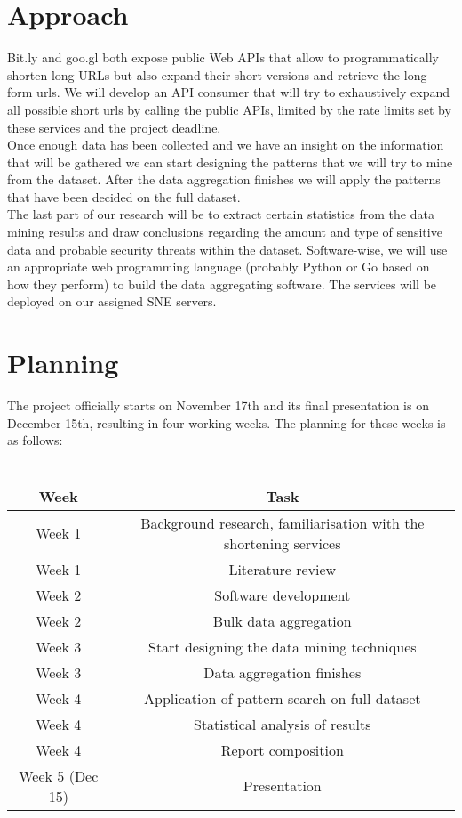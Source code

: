 \documentclass{article}
\begin{document}
\section{Approach}
Bit.ly and goo.gl both expose public Web APIs that allow to programmatically shorten long URLs but also expand their short versions and retrieve the long form urls. We will develop an API consumer that will try to exhaustively expand all possible short urls by calling the public APIs, limited by the rate limits set by these services and the project deadline. \\
Once enough data has been collected and we have an insight on the information that will be gathered we can start designing the patterns that we will try to mine from the dataset. After the data aggregation finishes we will apply the patterns that have been decided on the full dataset.\\
The last part of our research will be to extract certain statistics from the data mining results and draw conclusions regarding the amount and type of sensitive data and probable security threats within the dataset. 
Software-wise, we will use an appropriate web programming language (probably Python or Go based on how they perform) to build the data aggregating software. The services will be deployed on our assigned SNE servers.\\
\newpage
\section{Planning}
The project officially starts on November 17th and its final presentation is on December 15th, resulting in four working weeks. The planning for these weeks is as follows:
\\\\
\begin{table}[h]
  \begin{tabular}{|c|c|}
    \hline
    Week  & Task \\
    \hline
    Week 1 & Background research, familiarisation with the shortening services \\
    \hline
    Week 1 & Literature review   \\
    \hline
    Week 2 & Software development \\
    \hline
    Week 2  & Bulk data aggregation \\
    \hline
    Week 3 & Start designing the data mining techniques\\
    \hline
    Week 3 & Data aggregation finishes\\
    \hline
    Week 4 & Application of pattern search on full dataset \\
    \hline
    Week 4  & Statistical analysis of results \\
    \hline
    Week 4  & Report composition  \\
    \hline
    Week 5 (Dec 15) & Presentation \\
    \hline
  \end{tabular}
\end{table}\\
\end{document}
